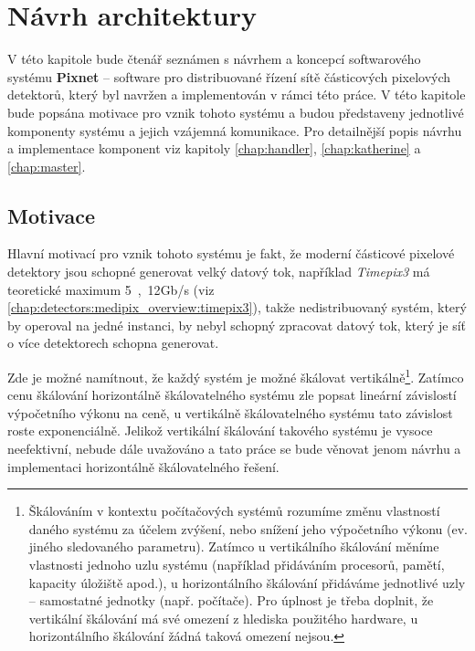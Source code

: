 

\chapter{Návrh architektury}\label{chap:arch}
V této kapitole bude čtenář seznámen s návrhem a koncepcí softwarového systému \textbf{Pixnet} -- software pro distribuované řízení sítě částicových pixelových detektorů, který byl navržen a implementován v rámci této práce. V této kapitole bude popsána motivace pro vznik tohoto systému a budou představeny jednotlivé komponenty systému a jejich vzájemná komunikace. Pro detailnější popis návrhu a implementace komponent viz kapitoly \ref{chap:handler}, \ref{chap:katherine} a \ref{chap:master}.

\section{Motivace}\label{chap:arch:motivation}
Hlavní motivací pro vznik tohoto systému je fakt, že moderní částicové pixelové detektory jsou schopné generovat velký datový tok, například \textit{Timepix3} má teoretické maximum \unit{5,12}{Gb/s} (viz \ref{chap:detectors:medipix_overview:timepix3}), takže nedistribuovaný systém, který by operoval na jedné instanci, by nebyl schopný zpracovat datový tok, který je síť o více detektorech schopna generovat. 

Zde je možné namítnout, že každý systém je možné škálovat vertikálně\footnote{Škálováním v kontextu počítačových systémů rozumíme změnu vlastností daného systému za účelem zvýšení, nebo snížení jeho výpočetního výkonu (ev. jiného sledovaného parametru). Zatímco u vertikálního škálování měníme vlastnosti jednoho uzlu systému (například přidáváním procesorů, pamětí, kapacity úložiště apod.), u horizontálního škálování přidáváme jednotlivé uzly -- samostatné  jednotky (např. počítače). Pro úplnost je třeba doplnit, že vertikální škálování má své omezení z hlediska použitého hardware, u horizontálního škálování žádná taková omezení nejsou.}. Zatímco cenu škálování horizontálně škálovatelného systému zle popsat lineární závislostí výpočetního výkonu na ceně, u vertikálně škálovatelného systému tato závislost roste exponenciálně. Jelikož vertikální škálování takového systému je  vysoce neefektivní, nebude dále uvažováno a tato práce se bude věnovat jenom návrhu a implementaci horizontálně škálovatelného řešení.

